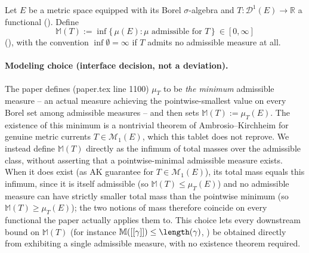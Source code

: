 \begin{definition}
  Let $E$ be a metric space equipped with its Borel $\sigma$-algebra and $T \colon \mathcal{D}^1(E)
  \to \mathbb{R}$ a functional (). Define
  \[
    \mathbb{M}(T) := \inf \{\, \mu(E) : \mu \text{ admissible for } T \,\} \ \in [0,\infty]
  \]
  (), with the convention $\inf \emptyset = \infty$ if $T$ admits no
  admissible measure at all.

  \paragraph{Modeling choice (interface decision, not a deviation).} The paper defines
  (paper.tex line 1100) $\mu_T$ to be \emph{the minimum} admissible measure -- an actual measure
  achieving the pointwise-smallest value on every Borel set among admissible measures -- and then
  sets $\mathbb{M}(T) := \mu_T(E)$. The existence of this minimum is a nontrivial theorem of
  Ambrosio--Kirchheim for genuine metric currents $T \in \mathcal{M}_1(E)$, which this tablet does
  not reprove. We instead define $\mathbb{M}(T)$ directly as the infimum of total masses over the
  admissible class, without asserting that a pointwise-minimal admissible measure exists. When it
  does exist (as AK guarantee for $T \in \mathcal{M}_1(E)$), its total mass equals this infimum,
  since it is itself admissible (so $\mathbb{M}(T) \le \mu_T(E)$) and no admissible measure can have
  strictly smaller total mass than the pointwise minimum (so $\mathbb{M}(T) \ge \mu_T(E)$); the two
  notions of mass therefore coincide on every functional the paper actually applies them to. This
  choice lets every downstream bound on $\mathbb{M}(T)$ (for instance
  $\mathbb{M}([[\gamma]]) \le \length(\gamma)$, ) be obtained directly
  from exhibiting a single admissible measure, with no existence theorem required.
\end{definition}
